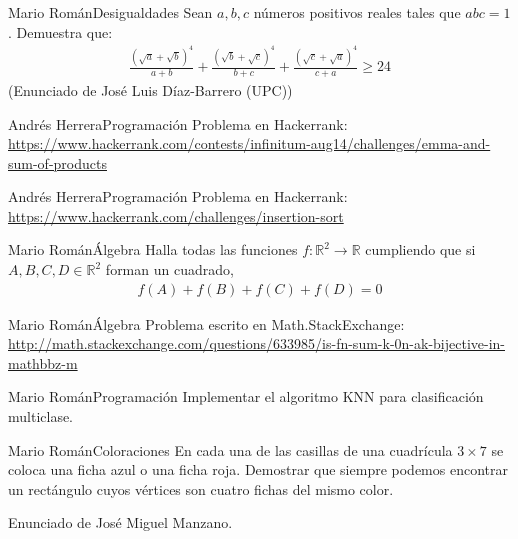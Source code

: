 \documentclass[a4paper, 11pt]{article} %
\numberwithin{prbcounter}{section}
\begin{document}
  
  
  \begin{enunciado}{Mario Román}{Desigualdades}
    Sean $a, b, c$ números positivos reales tales que $abc = 1$. Demuestra que:
    \begin{gather*}
      \frac{\left(\sqrt{a}+\sqrt{b}\right)^4}{a+b}+\frac{\left(\sqrt{b}+\sqrt{c}\right)^4}{b+c}+\frac{\left(\sqrt{c}+\sqrt{a}\right)^4}{c+a}\geq24
    \end{gather*}
    (Enunciado de José Luis Díaz-Barrero (UPC))
  \end{enunciado}

  
  
  \begin{enunciado}{Andrés Herrera}{Programación}
    Problema en Hackerrank:
    \url{https://www.hackerrank.com/contests/infinitum-aug14/challenges/emma-and-sum-of-products}
  \end{enunciado}

  
  
  
  \begin{enunciado}{Andrés Herrera}{Programación}
    Problema en Hackerrank:
    \url{https://www.hackerrank.com/challenges/insertion-sort}
  \end{enunciado}
    
    
  
  \begin{enunciado}{Mario Román}{Álgebra}
    Halla todas las funciones $f: \mathbb{R}^2 \rightarrow \mathbb{R}$ cumpliendo
    que si $A,B,C,D \in \mathbb{R}^2$ forman un cuadrado,
    \begin{gather*}
      f(A) + f(B) + f(C) + f(D) = 0
    \end{gather*}
  \end{enunciado}
  
  
  \begin{enunciado}{Mario Román}{Álgebra}
    Problema escrito en Math.StackExchange:
    \url{http://math.stackexchange.com/questions/633985/is-fn-sum-k-0n-ak-bijective-in-mathbbz-m}
  \end{enunciado}

  \begin{enunciado}{Mario Román}{Programación}
    Implementar el algoritmo KNN para clasificación multiclase.
  \end{enunciado}

  \begin{enunciado}{Mario Román}{Coloraciones}
   En cada una de las casillas de una cuadrícula $3 \times 7$ se coloca una ficha azul o una ficha roja.
   Demostrar que siempre podemos encontrar un rectángulo cuyos vértices son cuatro fichas del mismo
   color.
   
   Enunciado de José Miguel Manzano. 
  \end{enunciado}

  
\end{document}
